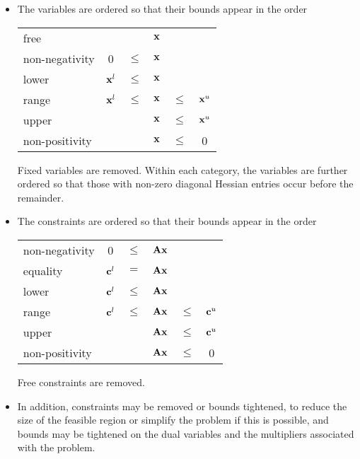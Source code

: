 \documentclass{galahad}
\begin{document}
\begin{itemize}
\item The variables are ordered so that their bounds appear in the order
\begin{center}
\begin{tabular}{lccccc}
free                &          &        & ${\mathbf{x}}$ &        &          \\
non-negativity      &   0      & $\leq$ & ${\mathbf{x}}$ &        &          \\
lower               & ${\mathbf{x}}^l$ & $\leq$ & ${\mathbf{x}}$ &        &          \\
range               & ${\mathbf{x}}^l$ & $\leq$ & ${\mathbf{x}}$ & $\leq$ & ${\mathbf{x}}^u$ \\
upper               &          &        & ${\mathbf{x}}$ & $\leq$ & ${\mathbf{x}}^u$ \\
non-positivity      &          &        & ${\mathbf{x}}$ & $\leq$ &      0   \\
\end{tabular}
\end{center}

Fixed variables are removed. Within each category, the variables
are further ordered so that those with non-zero diagonal Hessian
entries occur before the remainder.

\item
The constraints are ordered so that their bounds appear in the order
\begin{center}
\begin{tabular}{lccccc}
non-negativity      &     0    & $\leq$ & ${\mathbf{A}} {\mathbf{x}}$ &        &          \\
equality            & ${\mathbf{c}}^l$ &   $=$  & ${\mathbf{A}} {\mathbf{x}}$ &        &          \\
lower               & ${\mathbf{c}}^l$ & $\leq$ & ${\mathbf{A}} {\mathbf{x}}$ &        &          \\
range               & ${\mathbf{c}}^l$ & $\leq$ & ${\mathbf{A}} {\mathbf{x}}$ & $\leq$ & ${\mathbf{c}}^u$ \\
upper               &          &        & ${\mathbf{A}} {\mathbf{x}}$ & $\leq$ & ${\mathbf{c}}^u$ \\
non-positivity      &          &        & ${\mathbf{A}} {\mathbf{x}}$ & $\leq$ &     0    \\
\end{tabular}
\end{center}
Free constraints are removed.

\item
In addition, constraints may be removed or bounds tightened, to reduce the
size of the feasible region or simplify the problem if this is possible, and
bounds may be tightened on the dual variables and the multipliers
associated  with the problem.
\end{itemize}
\end{document}

